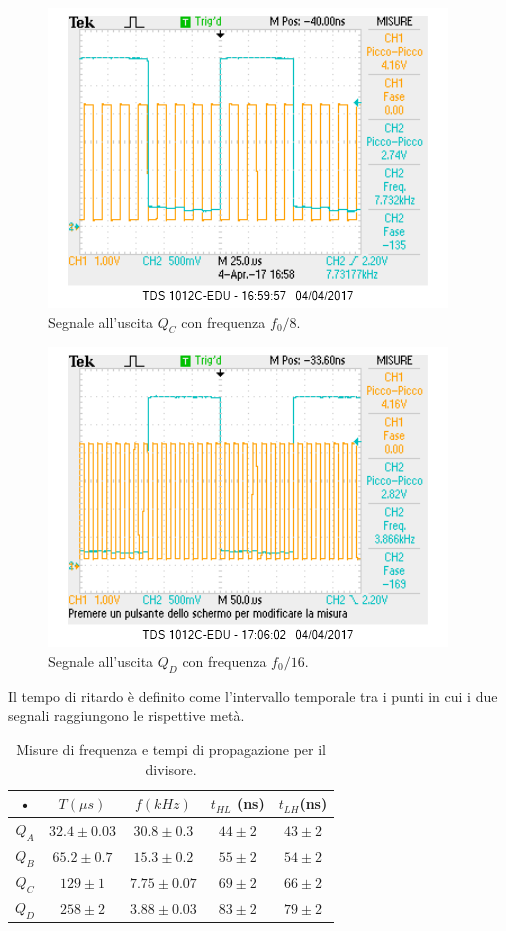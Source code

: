 \documentclass[10pt,a4paper]{article}
\begin{document}
\begin{figure}
\centering
\includegraphics[scale=1.0]{QC1-8.png}
\caption{Segnale all'uscita $Q_C$ con frequenza $f_0/8$.\label{freq8}}
\end{figure}

\begin{figure}
\centering
\includegraphics[scale=1.0]{QD1-16.png}
\caption{Segnale all'uscita $Q_D$ con frequenza $f_0/16$.\label{freq16}}
\end{figure}

Il tempo di ritardo è definito come l'intervallo temporale tra i punti in cui i due segnali raggiungono le rispettive metà.\\

\begin{table}[!htb]
\centering
\begin{tabular}{|c|c|c|c|c|}
\hline 
• & $T (\mu s)$ & $f (kHz)$ & $t_{HL}$ (ns) & $t_{LH}$(ns) \\ 
\hline 
$Q_A$ & $32.4 \pm 0.03$ & $30.8 \pm 0.3$ & $44 \pm 2$ & $43 \pm 2$ \\ 
\hline 
$Q_B$ & $65.2 \pm 0.7$ & $15.3 \pm 0.2$ & $55 \pm 2$ & $54 \pm 2$ \\ 
\hline 
$Q_C$ & $129 \pm 1$ & $7.75 \pm 0.07$ & $69 \pm 2$ & $66 \pm 2$ \\ 
\hline 
$Q_D$ & $258 \pm 2$ & $3.88 \pm 0.03$ & $83 \pm 2$ & $79 \pm 2$ \\ 
\hline 
\end{tabular} 
\caption{Misure di frequenza e tempi di propagazione per il divisore. \label{misureDivisore}}
\end{table}
\end{document}
